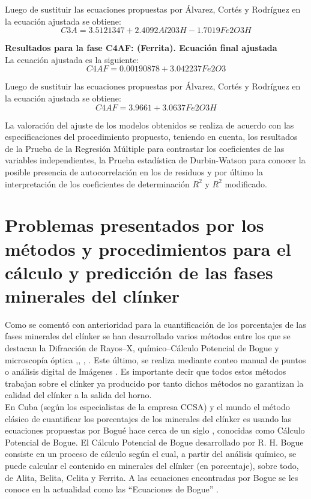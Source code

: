 \documentclass[spanish]{report}
\begin{document}
Luego de sustituir las ecuaciones propuestas por Álvarez, Cortés y Rodríguez en la ecuación ajustada se obtiene:
\begin{equation}
    C3A=3.5121347+2.4092Al203H-1.7019Fe2O3H
\end{equation}

\textbf{Resultados para la fase C4AF: (Ferrita). Ecuación final ajustada }\\

La ecuación ajustada es la siguiente:
\begin{equation}
    C4AF=0.00190878+3.042237Fe2O3
\end{equation}

Luego de sustituir las ecuaciones propuestas por Álvarez, Cortés y Rodríguez en la ecuación ajustada se obtiene:
\begin{equation}
    C4AF=3.9661+3.0637Fe2O3H
\end{equation}

La valoración del ajuste de los modelos obtenidos se realiza de acuerdo con las especificaciones del procedimiento propuesto, teniendo en cuenta, los resultados de la Prueba de la Regresión Múltiple para contrastar los coeficientes de las variables independientes, la Prueba estadística de Durbin-Watson para conocer la posible presencia de autocorrelación en los de residuos y por último la interpretación de los coeficientes de determinación $R^2$ y $R^2$ modificado.


\section{Problemas presentados por los métodos y procedimientos para el cálculo y predicción de las fases minerales del clínker}

Como se comentó con anterioridad para la cuantificación de los porcentajes de las fases minerales del clínker se han desarrollado varios métodos entre los que se destacan la Difracción de Rayos–X, químico–Cálculo Potencial de Bogue \cite{clark2002bogue} y  microscopía óptica \cite{holderbank1975},\cite{calderon77}, \cite{fundal1980microscopy}, \cite{camara1988analise}. Este último, se realiza  mediante conteo manual de puntos \cite{C1356M-96} o análisis digital de Imágenes \cite{garcia2003automatic}. Es importante decir que todos estos métodos trabajan sobre el clínker ya producido por tanto dichos métodos no garantizan la calidad del clínker a la salida del horno.\\

En Cuba (según los especialistas de la empresa CCSA) y el mundo el método clásico de cuantificar los porcentajes de los minerales del clínker es usando las ecuaciones propuestas por Bogué hace cerca de un siglo \cite{tobon2007replanteamiento}, conocidas como Cálculo Potencial de Bogue. El Cálculo Potencial de Bogue desarrollado por R. H. Bogue consiste en un proceso de cálculo según el cual, a partir del análisis químico, se puede calcular el contenido en minerales del clínker (en porcentaje), sobre todo, de Alita, Belita, Celita y Ferrita. A las ecuaciones encontradas por Bogue se les conoce en la actualidad como las “Ecuaciones de Bogue” \cite{duda2021manual}.\\
\end{document}
